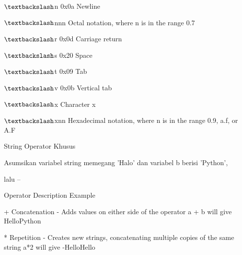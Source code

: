  $  \textbackslash  $n \hspace*{0.5in} 0x0a \hspace*{0.5in} Newline \par
 $  \textbackslash  $nnn \hspace*{0.5in}   \hspace*{0.5in} Octal notation, where n is in the range 0.7 \par
 $  \textbackslash  $r \hspace*{0.5in} 0x0d \hspace*{0.5in} Carriage return \par
 $  \textbackslash  $s \hspace*{0.5in} 0x20 \hspace*{0.5in} Space \par
 $  \textbackslash  $t \hspace*{0.5in} 0x09 \hspace*{0.5in} Tab \par
 $  \textbackslash  $v \hspace*{0.5in} 0x0b \hspace*{0.5in} Vertical tab \par
 $  \textbackslash  $x \hspace*{0.5in}   \hspace*{0.5in} Character x \par
 $  \textbackslash  $xnn \hspace*{0.5in}   \hspace*{0.5in} Hexadecimal notation, where n is in the range 0.9, a.f, or A.F \par
\vspace{12pt}
String Operator Khusus \par
\vspace{12pt}
Asumsikan variabel string memegang 'Halo' dan variabel b berisi 'Python',  \par
lalu – \par
\vspace{12pt}
Operator \hspace*{0.5in} Description \hspace*{0.5in} Example \par
+ \hspace*{0.5in} Concatenation - Adds values on either side of the operator \hspace*{0.5in} a + b will give HelloPython \par
* \hspace*{0.5in} Repetition - Creates new strings, concatenating multiple copies of the same string \hspace*{0.5in} a*2 will give -HelloHello \par
